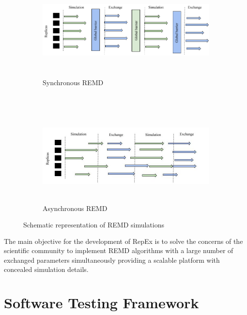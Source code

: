 \documentclass[10pt]{ruthesis}
\begin{document}
\begin{figure}

\begin{subfigure}{.5\textwidth}
  \centering
  \includegraphics[width=16cm,height=5cm]{Sync.png}
  \caption{Synchronous REMD}
  \label{fig:sync}
\end{subfigure}%
\\
\begin{subfigure}{.5\textwidth}
  \centering
  \includegraphics[width=16cm,height=5cm]{async.jpg}
  \caption{Asynchronous REMD}
  \label{fig:async}
\end{subfigure}
\caption{Schematic representation of REMD simulations \cite{ref5}}
\label{fig:repex}
\end{figure}


The main objective for the development of RepEx is to solve the concerns of the scientific community to implement REMD algorithms with a large number of exchanged parameters simultaneously providing a scalable platform with concealed simulation details.


\chapter{Software Testing Framework}
\end{document}
